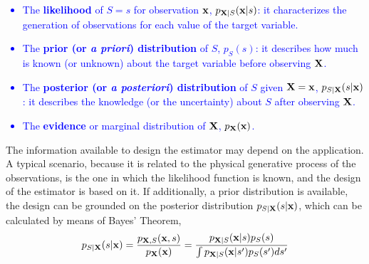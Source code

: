 \textcolor{blue}{\begin{itemize}
\item The {\bf likelihood} of $S=s$ for observation ${\bf x}$, $p_{{\bf X}|S}({\bf x}|s)$: it characterizes the generation of observations for each value of the target variable.
\item The {\bf prior (or \textit{a priori}) distribution}  of $S$, $p_S(s)$: it describes how much is known (or unknown) about the target variable before observing ${\bf X}$. 
\item The {\bf posterior (or \textit{a posteriori}) distribution} of $S$ given ${\bf X}={\bf x}$, $p_{S|{\bf X}}(s|{\bf x})$: it describes the knowledge (or the uncertainty) about $S$ after observing ${\bf X}$.
\item The {\bf evidence} or marginal distribution of ${\bf X}$, $p_{{\bf X}}({\bf x})$.
\end{itemize}}


The information available to design the estimator may depend on the application. A typical scenario, because it is related to the physical generative process of the observations, is the one in which the likelihood function is known, and the design of the estimator is based on it. If additionally, a prior distribution is available, the design can be grounded on the posterior distribution $p_{S|{\bf X}}(s|{\bf x})$, which can be calculated by means of Bayes' Theorem,
\begin{equation}
p_{S|{\bf X}}(s|{\bf x}) 
	= \frac{p_{{\bf X},S}({\bf x},s)} {p_{\bf X}({\bf x})} 
	= \frac{p_{{\bf X}|S}({\bf x}|s) p_S(s)}
	       {\int p_{{\bf X}|S}({\bf x}|s') p_S(s') ds'}
\end{equation}


